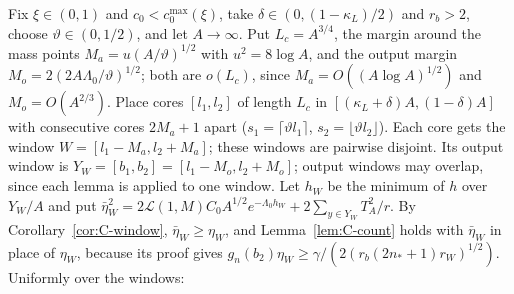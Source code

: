 Fix $\xi\in(0,1)$ and $c_0<c_{0}^{\max}(\xi)$, take $\delta\in(0,(1-\kappa_L)/2)$ and $r_b>2$, choose $\vartheta\in(0,1/2)$, and let $A\to\infty$. Put
$L_c=A^{3/4}$, the margin around the mass points $M_a=u(A/\vartheta)^{1/2}$ with $u^2=8\log A$, and the output margin
$M_o=2(2A\Lambda_0/\vartheta)^{1/2}$; both are $o(L_c)$, since $M_a=O((A\log A)^{1/2})$ and $M_o=O(A^{2/3})$. Place cores $[l_1,l_2]$ of
length $L_c$ in $[(\kappa_L+\delta)A,(1-\delta)A]$ with consecutive cores $2M_a+1$ apart ($s_1=\lceil\vartheta l_1\rceil$,
$s_2=\lfloor\vartheta l_2\rfloor$). Each core gets the window $W=[l_1-M_a,l_2+M_a]$; these windows are pairwise disjoint. Its output
window is $Y_W=[b_1,b_2]=[l_1-M_o,l_2+M_o]$; output windows may overlap, since each lemma is applied to one window. Let $h_W$ be the
minimum of $h$ over $Y_W/A$ and put
$\bar\eta_W^2=2\mathcal L(1,M)C_0A^{1/2}e^{-\Lambda_0h_W}+2\sum_{y\in Y_W}T_A^2/r$. By Corollary~\ref{cor:C-window}, $\bar\eta_W\ge\eta_W$, and
Lemma~\ref{lem:C-count} holds with $\bar\eta_W$ in place of $\eta_W$, because its proof gives
$g_n(b_2)\eta_W\ge\gamma/(2(r_b(2n_*+1)r_W)^{1/2})$. Uniformly over the windows:
